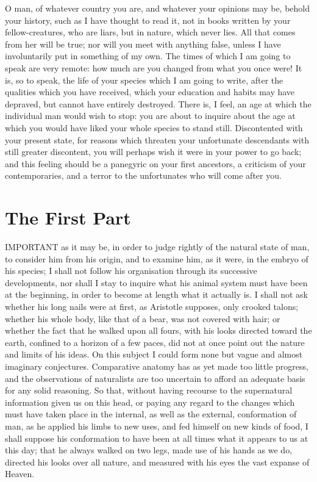 \documentclass[12pt]{report}
\newcommand{\mychapter}[2]{
\setcounter{chapter}{#1}
    \setcounter{section}{0}
    \chapter*{#2}
    \addcontentsline{toc}{section}{#2}
}
\begin{document}
O man, of whatever country you are, and whatever your opinions may be, behold your history, such as I have thought to read it, not in books written by your fellow-creatures, who are liars, but in nature, which never lies. All that comes from her will be true; nor will you meet with anything false, unless I have involuntarily put in something of my own. The times of which I am going to speak are very remote: how much are you changed from what you once were! It is, so to speak, the life of your species which I am going to write, after the qualities which you have received, which your education and habits may have depraved, but cannot have entirely destroyed. There is, I feel, an age at which the individual man would wish to stop: you are about to inquire about the age at which you would have liked your whole species to stand still. Discontented with your present state, for reasons which threaten your unfortunate descendants with still greater discontent, you will perhaps wish it were in your power to go back; and this feeling should be a panegyric on your first ancestors, a criticism of your contemporaries, and a terror to the unfortunates who will come after you.
\titlespacing{\chapter}{0mm}{-2em}{1em}
\mychapter{3}{The First Part}
IMPORTANT as it may be, in order to judge rightly of the natural state of man, to consider him from his origin, and to examine him, as it were, in the embryo of his species; I shall not follow his organisation through its successive developments, nor shall I stay to inquire what his animal system must have been at the beginning, in order to become at length what it actually is. I shall not ask whether his long nails were at first, as Aristotle supposes, only crooked talons; whether his whole body, like that of a bear, was not covered with hair; or whether the fact that he walked upon all fours, with his looks directed toward the earth, confined to a horizon of a few paces, did not at once point out the nature and limits of his ideas. On this subject I could form none but vague and almost imaginary conjectures. Comparative anatomy has as yet made too little progress, and the observations of naturalists are too uncertain to afford an adequate basis for any solid reasoning. So that, without having recourse to the supernatural information given us on this head, or paying any regard to the changes which must have taken place in the internal, as well as the external, conformation of man, as he applied his limbs to new uses, and fed himself on new kinds of food, I shall suppose his conformation to have been at all times what it appears to us at this day; that he always walked on two legs, made use of his hands as we do, directed his looks over all nature, and measured with his eyes the vast expanse of Heaven.
\end{document}
